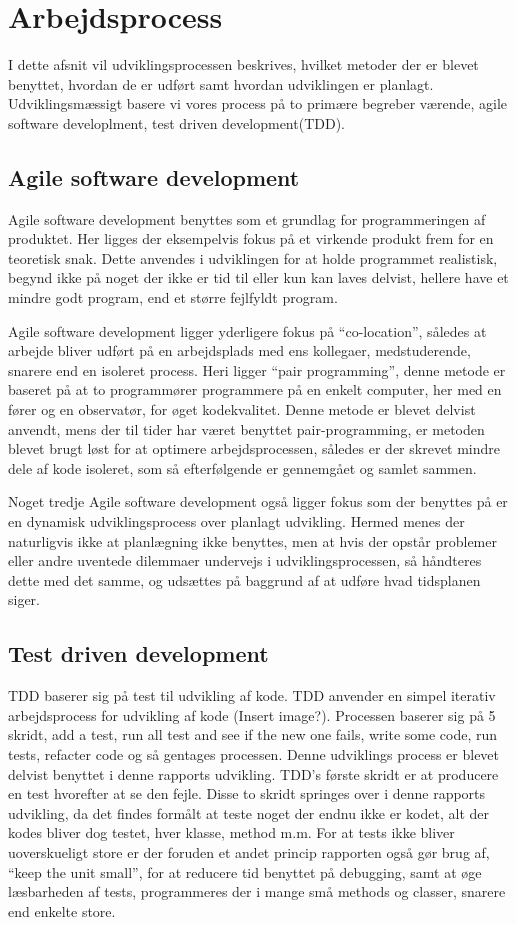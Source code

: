\chapter{Arbejdsprocess}
I dette afsnit vil udviklingsprocessen beskrives, hvilket metoder der er blevet benyttet, hvordan de er udført samt hvordan udviklingen er planlagt. Udviklingsmæssigt basere vi vores process på to primære begreber værende, agile software developlment, test driven development(TDD).

\section{Agile software development}
Agile software development benyttes som et grundlag for programmeringen af produktet. Her ligges der eksempelvis fokus på et virkende produkt frem for en teoretisk snak. Dette anvendes i udviklingen for at holde programmet realistisk, begynd ikke på noget der ikke er tid til eller kun kan laves delvist, hellere have et mindre godt program, end et større fejlfyldt program.

Agile software development ligger yderligere fokus på ``co-location'', således at arbejde bliver udført på en arbejdsplads med ens kollegaer, medstuderende, snarere end en isoleret process. Heri ligger ``pair programming'', denne metode er baseret på at to programmører programmere på en enkelt computer, her med en fører og en observatør, for øget kodekvalitet. Denne metode er blevet delvist anvendt, mens der til tider har været benyttet pair-programming, er metoden blevet brugt løst for at optimere arbejdsprocessen, således er der skrevet mindre dele af kode isoleret, som så efterfølgende er gennemgået og samlet sammen.

Noget tredje Agile software development også ligger fokus som der benyttes på er en dynamisk udviklingsprocess over planlagt udvikling. Hermed menes der naturligvis ikke at planlægning ikke benyttes, men at hvis der opstår problemer eller andre uventede dilemmaer undervejs i udviklingsprocessen, så håndteres dette med det samme, og udsættes på baggrund af at udføre hvad tidsplanen siger. 

\section{Test driven development}
TDD baserer sig på test til udvikling af kode. TDD anvender en simpel iterativ arbejdsprocess for udvikling af kode (Insert image?). Processen baserer sig på 5 skridt, add a test, run all test and see if the new one fails, write some code, run tests, refacter code og så gentages processen. Denne udviklings process er blevet delvist benyttet i denne rapports udvikling. TDD's første skridt er at producere en test hvorefter at se den fejle. Disse to skridt springes over i denne rapports udvikling, da det findes formålt at teste noget der endnu ikke er kodet, alt der kodes bliver dog testet, hver klasse, method m.m. For at tests ikke bliver uoverskueligt store er der foruden et andet princip rapporten også gør brug af, ``keep the unit small'', for at reducere tid benyttet på debugging, samt at øge læsbarheden af tests, programmeres der i mange små methods og classer, snarere end enkelte store.